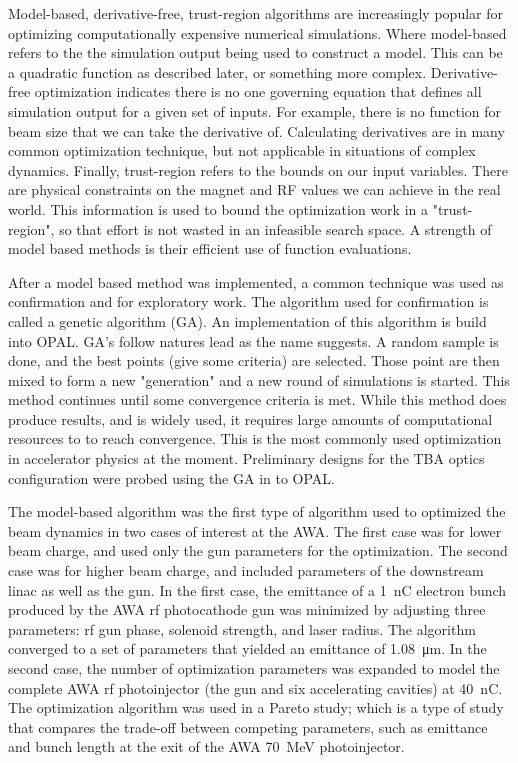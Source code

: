Model-based, derivative-free, trust-region algorithms 
are increasingly popular for optimizing computationally 
expensive numerical simulations. Where model-based refers
to the the simulation output being used to construct a 
model. This can be a quadratic function as described later, 
or something more complex.
Derivative-free optimization indicates there is no one 
governing equation that defines all simulation output
for a given set of inputs. For example, there is no 
function for beam size that we can take the derivative of.
Calculating derivatives are in many common optimization technique, 
but not applicable in situations of complex dynamics.
Finally, trust-region refers to the bounds on our input variables.
There are physical constraints on the magnet and RF values we 
can achieve in the real world. This information is used 
to bound the optimization work in a "trust-region", so that
effort is not wasted in an infeasible search space.
A strength of model based methods is their efficient use of function evaluations. 

After a model based method was implemented, a common technique was 
used as confirmation and for exploratory work. The algorithm used for confirmation 
is called a genetic algorithm (GA). An implementation of this algorithm is
build into OPAL. GA's follow natures lead as the name suggests.
A random sample is done, and the best points (give some criteria)
are selected. Those point are then mixed to form a new "generation"
and a new round of simulations is started. This method continues
until some convergence criteria is met. While this method does 
produce results, and is widely used, it requires large amounts 
of computational resources to to reach convergence.
This is the most commonly used optimization in accelerator physics
at the moment. Preliminary designs 
for the TBA optics configuration were probed using the GA in to OPAL. 



The model-based algorithm was the first type of algorithm used to optimized the beam dynamics 
in two cases of interest at the AWA.
The first case was for lower beam charge, and used only the gun parameters for the optimization.  
The second case was for higher beam charge, and included parameters of the downstream linac as well as the gun.
In the first case,  the emittance of a \SI{1}{nC} electron 
bunch produced by the AWA rf photocathode gun 
was minimized by adjusting three parameters: rf gun phase, 
solenoid strength, and laser radius. The algorithm 
converged to a set of parameters that yielded an
emittance of \SI{1.08}{\um}. In the second case, 
the number of optimization parameters was expanded to model the complete AWA rf 
photoinjector (the gun and six accelerating cavities) at \SI{40}{nC}. 
The optimization algorithm was used in a Pareto study; which is a type of study that compares the 
trade-off between competing parameters, such as emittance and bunch 
length at the exit of the AWA \SI{70}{MeV} photoinjector. 

